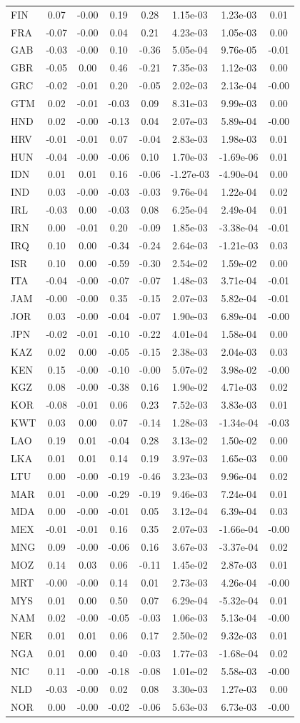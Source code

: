 \documentclass{article}
\begin{document}
\begin{table}[tbp]
\begin{tabularx}{\linewidth}{@{}lCCCCCCC@{}}
FIN&0.07&-0.00&0.19&0.28&1.15e-03&1.23e-03&0.01 \tabularnewline
FRA&-0.07&-0.00&0.04&0.21&4.23e-03&1.05e-03&0.00 \tabularnewline
GAB&-0.03&-0.00&0.10&-0.36&5.05e-04&9.76e-05&-0.01 \tabularnewline
GBR&-0.05&0.00&0.46&-0.21&7.35e-03&1.12e-03&0.00 \tabularnewline
GRC&-0.02&-0.01&0.20&-0.05&2.02e-03&2.13e-04&-0.00 \tabularnewline
GTM&0.02&-0.01&-0.03&0.09&8.31e-03&9.99e-03&0.00 \tabularnewline
HND&0.02&-0.00&-0.13&0.04&2.07e-03&5.89e-04&-0.00 \tabularnewline
HRV&-0.01&-0.01&0.07&-0.04&2.83e-03&1.98e-03&0.01 \tabularnewline
HUN&-0.04&-0.00&-0.06&0.10&1.70e-03&-1.69e-06&0.01 \tabularnewline
IDN&0.01&0.01&0.16&-0.06&-1.27e-03&-4.90e-04&0.00 \tabularnewline
IND&0.03&-0.00&-0.03&-0.03&9.76e-04&1.22e-04&0.02 \tabularnewline
IRL&-0.03&0.00&-0.03&0.08&6.25e-04&2.49e-04&0.01 \tabularnewline
IRN&0.00&-0.01&0.20&-0.09&1.85e-03&-3.38e-04&-0.01 \tabularnewline
IRQ&0.10&0.00&-0.34&-0.24&2.64e-03&-1.21e-03&0.03 \tabularnewline
ISR&0.10&0.00&-0.59&-0.30&2.54e-02&1.59e-02&0.00 \tabularnewline
ITA&-0.04&-0.00&-0.07&-0.07&1.48e-03&3.71e-04&-0.01 \tabularnewline
JAM&-0.00&-0.00&0.35&-0.15&2.07e-03&5.82e-04&-0.01 \tabularnewline
JOR&0.03&-0.00&-0.04&-0.07&1.90e-03&6.89e-04&-0.00 \tabularnewline
JPN&-0.02&-0.01&-0.10&-0.22&4.01e-04&1.58e-04&0.00 \tabularnewline
KAZ&0.02&0.00&-0.05&-0.15&2.38e-03&2.04e-03&0.03 \tabularnewline
KEN&0.15&-0.00&-0.10&-0.00&5.07e-02&3.98e-02&-0.00 \tabularnewline
KGZ&0.08&-0.00&-0.38&0.16&1.90e-02&4.71e-03&0.02 \tabularnewline
KOR&-0.08&-0.01&0.06&0.23&7.52e-03&3.83e-03&0.01 \tabularnewline
KWT&0.03&0.00&0.07&-0.14&1.28e-03&-1.34e-04&-0.03 \tabularnewline
LAO&0.19&0.01&-0.04&0.28&3.13e-02&1.50e-02&0.00 \tabularnewline
LKA&0.01&0.01&0.14&0.19&3.97e-03&1.65e-03&0.00 \tabularnewline
LTU&0.00&-0.00&-0.19&-0.46&3.23e-03&9.96e-04&0.02 \tabularnewline
MAR&0.01&-0.00&-0.29&-0.19&9.46e-03&7.24e-04&0.01 \tabularnewline
MDA&0.00&-0.00&-0.01&0.05&3.12e-04&6.39e-04&0.03 \tabularnewline
MEX&-0.01&-0.01&0.16&0.35&2.07e-03&-1.66e-04&-0.00 \tabularnewline
MNG&0.09&-0.00&-0.06&0.16&3.67e-03&-3.37e-04&0.02 \tabularnewline
MOZ&0.14&0.03&0.06&-0.11&1.45e-02&2.87e-03&0.01 \tabularnewline
MRT&-0.00&-0.00&0.14&0.01&2.73e-03&4.26e-04&-0.00 \tabularnewline
MYS&0.01&0.00&0.50&0.07&6.29e-04&-5.32e-04&0.01 \tabularnewline
NAM&0.02&-0.00&-0.05&-0.03&1.06e-03&5.13e-04&-0.00 \tabularnewline
NER&0.01&0.01&0.06&0.17&2.50e-02&9.32e-03&0.01 \tabularnewline
NGA&0.01&0.00&0.40&-0.03&1.77e-03&-1.68e-04&0.02 \tabularnewline
NIC&0.11&-0.00&-0.18&-0.08&1.01e-02&5.58e-03&-0.00 \tabularnewline
NLD&-0.03&-0.00&0.02&0.08&3.30e-03&1.27e-03&0.00 \tabularnewline
NOR&0.00&-0.00&-0.02&-0.06&5.63e-03&6.73e-03&-0.00 \tabularnewline

\end{tabularx}
\end{table}
\end{document}
